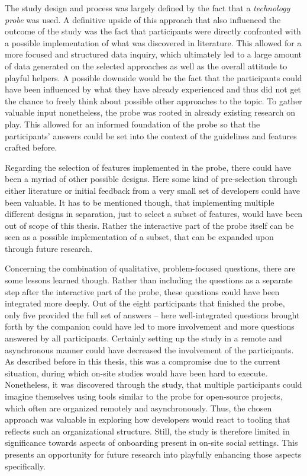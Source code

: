 The study design and process was largely defined by the fact that a \textit{technology probe} was used. A definitive upside of this approach that also influenced the outcome of the study was the fact that participants were directly confronted with a possible implementation of what was discovered in literature. This allowed for a more focused and structured data inquiry, which ultimately led to a large amount of data generated on the selected approaches as well as the overall attitude to playful helpers. A possible downside would be the fact that the participants could have been influenced by what they have already experienced and thus did not get the chance to freely think about possible other approaches to the topic. To gather valuable input nonetheless, the probe was rooted in already existing research on play. This allowed for an informed foundation of the probe so that the participants' answers could be set into the context of the guidelines and features crafted before.

Regarding the selection of features implemented in the probe, there could have been a myriad of other possible designs. Here some kind of pre-selection through either literature or initial feedback from a very small set of developers could have been valuable. It has to be mentioned though, that implementing multiple different designs in separation, just to select a subset of features, would have been out of scope of this thesis. Rather the interactive part of the probe itself can be seen as a possible implementation of a subset, that can be expanded upon through future research.

Concerning the combination of qualitative, problem-focused questions, there are some lessons learned though. Rather than including the questions as a separate step after the interactive part of the probe, these questions could have been integrated more deeply. Out of the eight participants that finished the probe, only five provided the full set of answers -- here well-integrated questions brought forth by the companion could have led to more involvement and more questions answered by all participants. Certainly setting up the study in a remote and asynchronous manner could have decreased the involvement of the participants. As described before in this thesis, this was a compromise due to the current situation, during which on-site studies would have been hard to execute. Nonetheless, it was discovered through the study, that multiple participants could imagine themselves using tools similar to the probe for open-source projects, which often are organized remotely and asynchronously. Thus, the chosen approach was valuable in exploring how developers would react to tooling that reflects such an organizational structure. Still, the study is therefore limited in significance towards aspects of onboarding present in on-site social settings. This presents an opportunity for future research into playfully enhancing those aspects specifically.

